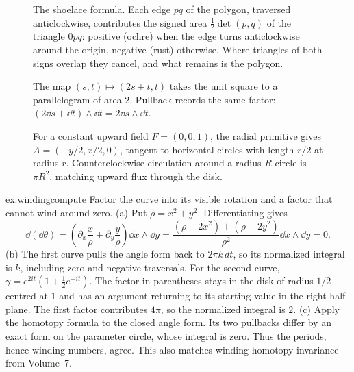 \begin{figure}[ht]
\centering
{}
\caption{The shoelace formula. Each edge $pq$ of the polygon, traversed anticlockwise, contributes the signed area $\frac12\det(p,q)$ of the triangle $0pq$:
positive (ochre) when the edge turns anticlockwise around the origin, negative (rust) otherwise. Where triangles of both signs overlap they cancel, and what
remains is the polygon.}
\label{fig:shoelace}
\end{figure}

\begin{figure}[ht]
\centering{}
\caption{The map $(s,t)\mapsto(2s+t,t)$ takes the unit square to a parallelogram of area $2$. Pullback records the same factor: $(2\dd s+\dd t)\wedge\dd t=2\dd s\wedge\dd t$.}
\label{fig:v9-ch03-pullback-area}
\end{figure}

\begin{figure}[ht]
\centering{}
\caption{For a constant upward field $F=(0,0,1)$, the radial primitive gives $A=(-y/2,x/2,0)$, tangent to horizontal circles with length $r/2$ at radius $r$. Counterclockwise circulation around a radius-$R$ circle is $\pi R^2$, matching upward flux through the disk.}
\label{fig:v9-ch03-vector-potential}
\end{figure}

\begin{solution}{ex:windingcompute}
\idea Factor the curve into its visible rotation and a factor that cannot wind around zero.
\writeup (a) Put $\rho=x^2+y^2$. Differentiating gives
\[
\dd(\dd\theta)=\left(\partial_x\frac x\rho+\partial_y\frac y\rho\right)\dd x\wedge\dd y
=\frac{(\rho-2x^2)+(\rho-2y^2)}{\rho^2}\dd x\wedge\dd y=0.
\]
(b) The first curve pulls the angle form back to $2\pi k\,dt$, so its normalized integral is $k$, including zero and negative traversals. For the second curve, $\gamma=e^{2it}(1+\tfrac12e^{-it})$. The factor in parentheses stays in the disk of radius $1/2$ centred at $1$ and has an argument returning to its starting value in the right half-plane. The first factor contributes $4\pi$, so the normalized integral is $2$.
(c) Apply the homotopy formula to the closed angle form. Its two pullbacks differ by an exact form on the parameter circle, whose integral is zero. Thus the periods, hence winding numbers, agree. This also matches winding homotopy invariance from Volume~7.
\end{solution}

